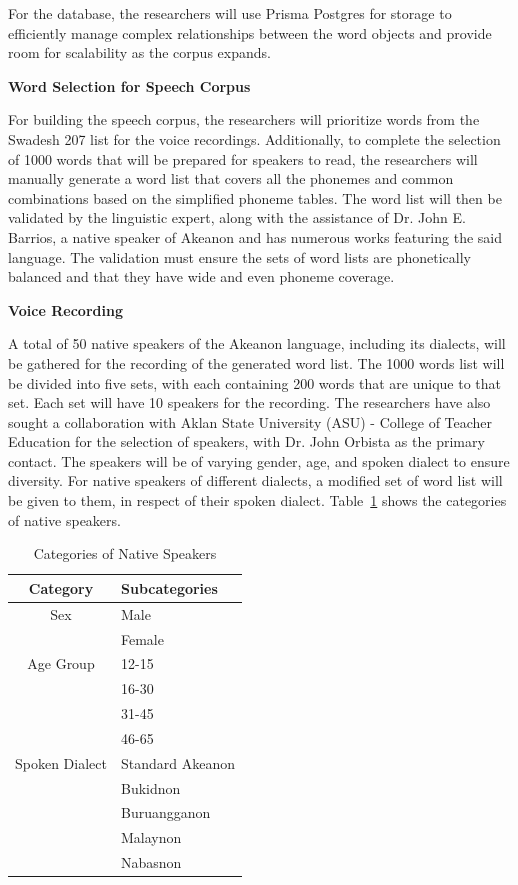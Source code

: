 For the database, the researchers will use Prisma Postgres for storage to efficiently manage complex relationships between the word objects and provide room for scalability as the corpus expands.

\textbf{Word Selection for Speech Corpus}

For building the speech corpus, the researchers will prioritize words from the Swadesh 207 list for the voice recordings. Additionally, to complete the selection of 1000 words that will be prepared for speakers to read, the researchers will manually generate a word list that covers all the phonemes and common combinations based on the simplified phoneme tables. The word list will then be validated by the linguistic expert, along with the assistance of Dr. John E. Barrios, a native speaker of Akeanon and has numerous works featuring the said language. The validation must ensure the sets of word lists are phonetically balanced and that they have wide and even phoneme coverage.

\textbf{Voice Recording}

A total of 50 native speakers of the Akeanon language, including its dialects, will be gathered for the recording of the generated word list. The 1000 words list will be divided into five sets, with each containing 200 words that are unique to that set. Each set will have 10 speakers for the recording. The researchers have also sought a collaboration with Aklan State University (ASU) - College of Teacher Education for the selection of speakers, with Dr. John Orbista as the primary contact. The speakers will be of varying gender, age, and spoken dialect to ensure diversity. For native speakers of different dialects, a modified set of word list will be given to them, in respect of their spoken dialect. Table~\ref{tab:native_speakers} shows the categories of native speakers. 

\begin{table}[H]
   \centering
   \caption{Categories of Native Speakers} \vspace{0.25em}
   \label{tab:native_speakers}
   \renewcommand{\arraystretch}{1.5} %
   \setlength{\tabcolsep}{10pt} %

\begin{tabular}{|c|p{2in}|} \hline
   \centering Category & Subcategories \\ \hline
   Sex & Male \\ 
   & Female \\ 
   \hline
   Age Group & 
   12-15 \\ 
   & 16-30 \\ 
   & 31-45 \\ 
   & 46-65 \\ \hline
   Spoken Dialect & 
   Standard Akeanon \\ 
   & Bukidnon \\ 
   & Buruangganon \\ 
   & Malaynon \\ 
   & Nabasnon \\ \hline
\end{tabular}
\end{table}

